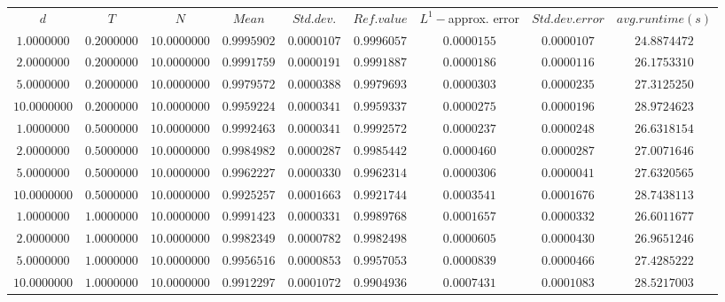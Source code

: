 \begin{tabular}{ccccccccc}
$d$ & $T$ & $N$ & $Mean$ & $Std. dev.$ & $Ref. value$ & $L^1-$approx. error & $Std. dev. error$ & $avg. runtime (s)$\\
$1.0000000$ & $0.2000000$ & $10.0000000$ & $0.9995902$ & $0.0000107$ & $0.9996057$ & $0.0000155$ & $0.0000107$ & $24.8874472$\\
$2.0000000$ & $0.2000000$ & $10.0000000$ & $0.9991759$ & $0.0000191$ & $0.9991887$ & $0.0000186$ & $0.0000116$ & $26.1753310$\\
$5.0000000$ & $0.2000000$ & $10.0000000$ & $0.9979572$ & $0.0000388$ & $0.9979693$ & $0.0000303$ & $0.0000235$ & $27.3125250$\\
$10.0000000$ & $0.2000000$ & $10.0000000$ & $0.9959224$ & $0.0000341$ & $0.9959337$ & $0.0000275$ & $0.0000196$ & $28.9724623$\\
$1.0000000$ & $0.5000000$ & $10.0000000$ & $0.9992463$ & $0.0000341$ & $0.9992572$ & $0.0000237$ & $0.0000248$ & $26.6318154$\\
$2.0000000$ & $0.5000000$ & $10.0000000$ & $0.9984982$ & $0.0000287$ & $0.9985442$ & $0.0000460$ & $0.0000287$ & $27.0071646$\\
$5.0000000$ & $0.5000000$ & $10.0000000$ & $0.9962227$ & $0.0000330$ & $0.9962314$ & $0.0000306$ & $0.0000041$ & $27.6320565$\\
$10.0000000$ & $0.5000000$ & $10.0000000$ & $0.9925257$ & $0.0001663$ & $0.9921744$ & $0.0003541$ & $0.0001676$ & $28.7438113$\\
$1.0000000$ & $1.0000000$ & $10.0000000$ & $0.9991423$ & $0.0000331$ & $0.9989768$ & $0.0001657$ & $0.0000332$ & $26.6011677$\\
$2.0000000$ & $1.0000000$ & $10.0000000$ & $0.9982349$ & $0.0000782$ & $0.9982498$ & $0.0000605$ & $0.0000430$ & $26.9651246$\\
$5.0000000$ & $1.0000000$ & $10.0000000$ & $0.9956516$ & $0.0000853$ & $0.9957053$ & $0.0000839$ & $0.0000466$ & $27.4285222$\\
$10.0000000$ & $1.0000000$ & $10.0000000$ & $0.9912297$ & $0.0001072$ & $0.9904936$ & $0.0007431$ & $0.0001083$ & $28.5217003$\\
\end{tabular}
